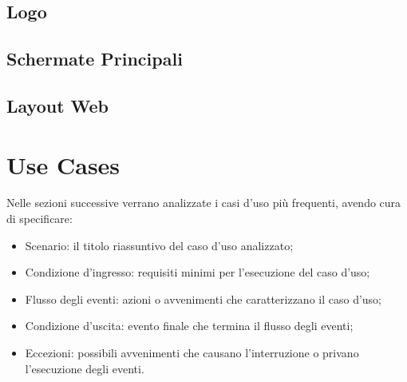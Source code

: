 \documentclass[12pt,a4paper,twoside,openright,titlepage]{book}
\begin{document}
\subsection{Logo}
\subsection{Schermate Principali}
\subsection{Layout Web}

\section{Use Cases}
Nelle sezioni successive verrano analizzate i casi d'uso più frequenti, avendo cura di specificare:
\begin{itemize}
\item Scenario: il titolo riassuntivo del caso d'uso analizzato;
\item Condizione d'ingresso: requisiti minimi per l'esecuzione del caso d'uso;
\item Flusso degli eventi: azioni o avvenimenti che caratterizzano il caso d'uso;
\item Condizione d'uscita: evento finale che termina il flusso degli eventi;
\item Eccezioni: possibili avvenimenti che causano l'interruzione o privano l'esecuzione degli eventi.
\end{itemize}
\end{document}
